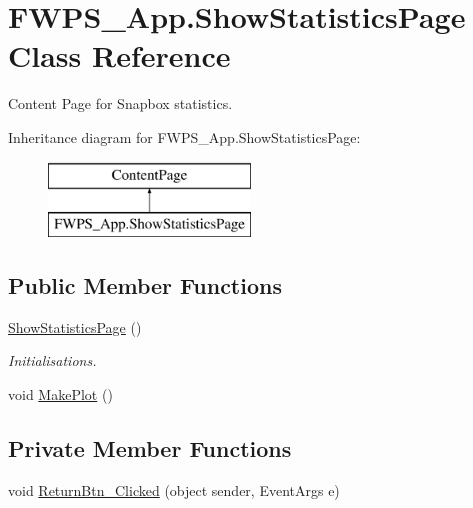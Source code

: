 \hypertarget{class_f_w_p_s___app_1_1_show_statistics_page}{}\section{F\+W\+P\+S\+\_\+\+App.\+Show\+Statistics\+Page Class Reference}
\label{class_f_w_p_s___app_1_1_show_statistics_page}


Content Page for Snapbox statistics.  


Inheritance diagram for F\+W\+P\+S\+\_\+\+App.\+Show\+Statistics\+Page\+:\begin{figure}[H]
\begin{center}
\leavevmode
\includegraphics[height=2.000000cm]{class_f_w_p_s___app_1_1_show_statistics_page}
\end{center}
\end{figure}
\subsection*{Public Member Functions}
\begin{DoxyCompactItemize}
\item 
\mbox{\hyperlink{class_f_w_p_s___app_1_1_show_statistics_page_ae76ab46b70af80f5f1599bac9851512f}{Show\+Statistics\+Page}} ()
\begin{DoxyCompactList}\small\item\em Initialisations. \end{DoxyCompactList}\item 
void \mbox{\hyperlink{class_f_w_p_s___app_1_1_show_statistics_page_a1028ff86cc7512a4965b6f69ce5bfc0d}{Make\+Plot}} ()
\end{DoxyCompactItemize}
\subsection*{Private Member Functions}
\begin{DoxyCompactItemize}
\item 
void \mbox{\hyperlink{class_f_w_p_s___app_1_1_show_statistics_page_adfd741fae41b18abed0520d158d3dac2}{Return\+Btn\+\_\+\+Clicked}} (object sender, Event\+Args e)
\end{DoxyCompactItemize}


